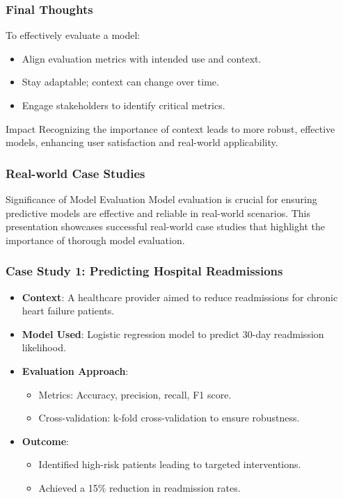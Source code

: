 \documentclass[aspectratio=169]{beamer}
\begin{document}
\begin{frame}[fragile]
    \frametitle{Final Thoughts}
    To effectively evaluate a model:
    \begin{itemize}
        \item Align evaluation metrics with intended use and context.
        \item Stay adaptable; context can change over time.
        \item Engage stakeholders to identify critical metrics.
    \end{itemize}
    \begin{block}{Impact}
        Recognizing the importance of context leads to more robust, effective models, enhancing user satisfaction and real-world applicability.
    \end{block}
\end{frame}

\begin{frame}[fragile]
    \frametitle{Real-world Case Studies}

    \begin{block}{Significance of Model Evaluation}
        Model evaluation is crucial for ensuring predictive models are effective and reliable in real-world scenarios. 
        This presentation showcases successful real-world case studies that highlight the importance of thorough model evaluation.
    \end{block}
\end{frame}

\begin{frame}[fragile]
    \frametitle{Case Study 1: Predicting Hospital Readmissions}
    
    \begin{itemize}
        \item \textbf{Context}: A healthcare provider aimed to reduce readmissions for chronic heart failure patients.
        
        \item \textbf{Model Used}: Logistic regression model to predict 30-day readmission likelihood.
        
        \item \textbf{Evaluation Approach}:
        \begin{itemize}
            \item Metrics: Accuracy, precision, recall, F1 score.
            \item Cross-validation: k-fold cross-validation to ensure robustness.
        \end{itemize}
        
        \item \textbf{Outcome}:
        \begin{itemize}
            \item Identified high-risk patients leading to targeted interventions.
            \item Achieved a 15\% reduction in readmission rates.
        \end{itemize}
    \end{itemize}
\end{frame}
\end{document}
